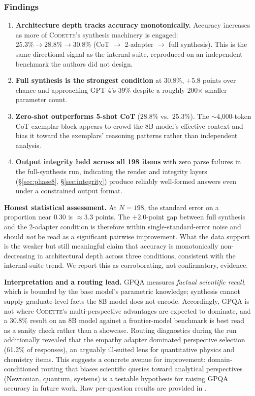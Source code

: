 \documentclass[11pt,a4paper]{article}
\newcommand{\codette}{\textsc{Codette}}
\begin{document}
\subsubsection{Findings}

\begin{enumerate}[nosep]
  \item \textbf{Architecture depth tracks accuracy monotonically.} Accuracy
    increases as more of \codette{}'s synthesis machinery is engaged:
    $25.3\% \to 28.8\% \to 30.8\%$ (CoT $\to$ 2-adapter $\to$ full synthesis).
    This is the same directional signal as the internal suite, reproduced on an
    independent benchmark the authors did not design.
  \item \textbf{Full synthesis is the strongest condition} at 30.8\%, $+5.8$
    points over chance and approaching GPT-4's 39\% despite a roughly
    200$\times$ smaller parameter count.
  \item \textbf{Zero-shot outperforms 5-shot CoT} ($28.8\%$ vs.\ $25.3\%$).
    The $\sim$4{,}000-token CoT exemplar block appears to crowd the 8B model's
    effective context and bias it toward the exemplars' reasoning patterns
    rather than independent analysis.
  \item \textbf{Output integrity held across all 198 items} with zero parse
    failures in the full-synthesis run, indicating the render and integrity
    layers (\S\ref{sec:phase8}, \S\ref{sec:integrity}) produce reliably
    well-formed answers even under a constrained output format.
\end{enumerate}

\noindent\textbf{Honest statistical assessment.} At $N=198$, the standard
error on a proportion near $0.30$ is $\approx 3.3$ points. The $+2.0$-point gap
between full synthesis and the 2-adapter condition is therefore within
single-standard-error noise and should \emph{not} be read as a significant
pairwise improvement. What the data support is the weaker but still meaningful
claim that accuracy is monotonically non-decreasing in architectural depth
across three conditions, consistent with the internal-suite trend. We report
this as corroborating, not confirmatory, evidence.

\noindent\textbf{Interpretation and a routing lead.} GPQA measures
\emph{factual scientific recall}, which is bounded by the base model's
parametric knowledge; synthesis cannot supply graduate-level facts the 8B model
does not encode. Accordingly, GPQA is not where \codette{}'s multi-perspective
advantages are expected to dominate, and a 30.8\% result on an 8B model against
a frontier-model benchmark is best read as a sanity check rather than a
showcase. Routing diagnostics during the run additionally revealed that the
empathy adapter dominated perspective selection (61.2\% of responses), an
arguably ill-suited lens for quantitative physics and chemistry items. This
suggests a concrete avenue for improvement: domain-conditioned routing that
biases scientific queries toward analytical perspectives (Newtonian, quantum,
systems) is a testable hypothesis for raising GPQA accuracy in future work.
Raw per-question results are provided in
.
\end{document}
